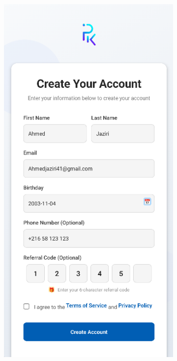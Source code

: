 \begin{figure}[htbp]
\begin{subfigure}[b]{0.25\textwidth}
        \label{fig:mobile-login}
    \end{subfigure}
    \hfill
    \begin{subfigure}[b]{0.25\textwidth}
        \centering
        \includegraphics[width=\textwidth]{images/mobile-auth-screen_signup.png}

\end{subfigure}
\end{figure}
